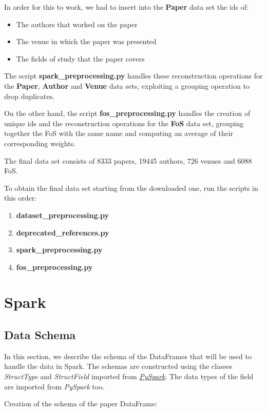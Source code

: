 \documentclass{Configuration_Files/PoliMi3i_thesis}
\begin{document}
In order for this to work, we had to insert into the \textbf{Paper} data set the ids of:
\begin{itemize}
    \item The authors that worked on the paper
    \item The venue in which the paper was presented
    \item The fields of study that the paper covers
\end{itemize}

The script \textbf{spark\_preprocessing.py} handles these reconstruction operations for the \textbf{Paper}, \textbf{Author} and \textbf{Venue} data sets, exploiting a grouping operation to drop duplicates.

On the other hand, the script \textbf{fos\_preprocessing.py} handles the creation of unique ids and the reconstruction operations for the \textbf{FoS} data set, grouping together the FoS with the same name and computing an average of their corresponding weights. 

The final data set consists of 8333 papers, 19445 authors, 726 venues and 6088 FoS. 

To obtain the final data set starting from the downloaded one, run the scripts in this order:
\begin{enumerate} 
    \item \textbf{dataset\_preprocessing.py}
    \item \textbf{deprecated\_references.py}
    \item \textbf{spark\_preprocessing.py}
    \item \textbf{fos\_preprocessing.py}
\end{enumerate}

\pagebreak
\section{Spark}
\label{ch:spark}
\subsection{Data Schema}
In this section, we describe the schema of the DataFrames that will be used to handle the data in Spark. 
The schemas are constructed using the classes \textit{StructType} and \textit{StructField} imported from \href{https://spark.apache.org/docs/latest/api/python/}{\textit{PySpark}}. The data types of the field are imported from \textit{PySpark} too.

Creation of the schema of the paper DataFrame:
 \inputminted[linenos,tabsize=2,breaklines]{Python}{code/code_spark/paper_schema.txt}
\end{document}
